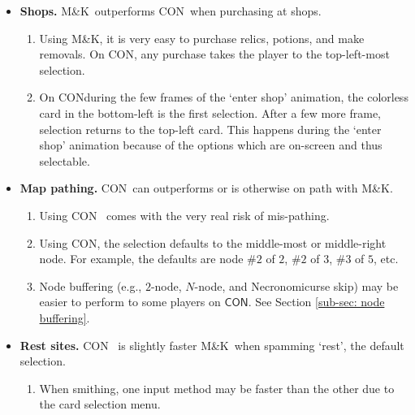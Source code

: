 \documentclass[12pt]{amsart}
\newcommand{\mk}{\textsf{M\&K}}
\newcommand{\con}{\textsf{CON}}
\begin{document}
\begin{itemize}
\begin{enumerate}[-]
		\item 
		    On \con, for a few frames at the star of combat, any combat-only potion defaults to the `discard' option.  
		    Additionally, the potion panel does not wrap around and the empty slots occupy space.  
		    As with \mk, cards cannot be selected prematurely during their draw animation.  
		    For this reason, moving `left' from first position during the draw animation takes the player to the last card selectable, not the last card being drawn.  
		\end{enumerate}
	\item 
		\textbf{Shops.  }
		\mk~outperforms \con~when purchasing at shops.  
		\begin{enumerate}[-]
		    \item 
		        Using \mk, it is very easy to purchase relics, potions, and make removals.  
		        On \con, any purchase takes the player to the top-left-most selection.  
	        \item 
	            On \con during the few frames of the `enter shop' animation, the colorless card in the bottom-left is the first selection.  
	            After a few more frame, selection returns to the top-left card.  
	            This happens during the `enter shop' animation because of the options which are on-screen and thus selectable.  
		\end{enumerate}
	\item 
        \textbf{Map pathing.  }
        \con~can outperforms or is otherwise on path with \mk.  
        \begin{enumerate}[-]
            \item 
                Using \con~ comes with the very real risk of mis-pathing.  
            \item 
                Using \con, the selection defaults to the middle-most or middle-right node.  
                For example, the defaults are node $\#2$ of $2$, $\#2$ of $3$, $\#3$ of $5$, etc.  
            \item 
                Node buffering (e.g., $2$-node, $N$-node, and Necronomicurse skip) may be easier to perform to some players on $\con$.  
                See Section \ref{sub-sec: node buffering}.  
        \end{enumerate}
    \item 
        \textbf{Rest sites.  }
        \con~ is slightly faster \mk~when spamming `rest', the default selection.  
        \begin{enumerate}[-]
            \item 
                When smithing, one input method may be faster than the other due to the card selection menu.  
        \end{enumerate}
\end{itemize}
\end{document}
